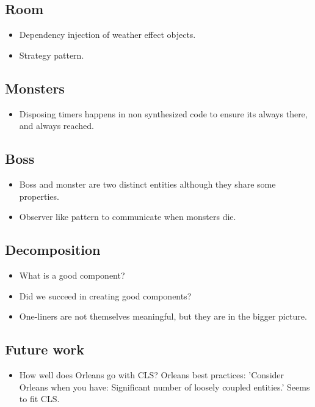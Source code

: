 \subsection{Room}
\begin{itemize}
	\item Dependency injection of weather effect objects.
	\item Strategy pattern.
\end{itemize}

\subsection{Monsters}
\begin{itemize}
	\item Disposing timers happens in non synthesized code to ensure its always there, and always reached.
\end{itemize}

\subsection{Boss}
\begin{itemize}
	\item Boss and monster are two distinct entities although they share some properties.
	\item Observer like pattern to communicate when monsters die.
\end{itemize}

\subsection{Decomposition}
\begin{itemize}
	\item What is a good component?
	\item Did we succeed in creating good components?
	\item One-liners are not themselves meaningful, but they are in the bigger picture.
\end{itemize}

\subsection{Future work}
\begin{itemize}
	\item How well does Orleans go with CLS? Orleans best practices: 'Consider Orleans when you have: Significant number of loosely coupled entities.' Seems to fit CLS. 
\end{itemize}